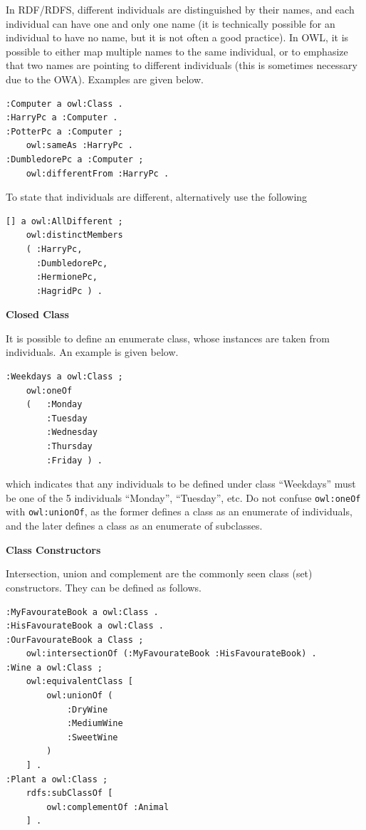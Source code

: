 In RDF/RDFS, different individuals are distinguished by their names, and each individual can have one and only one name (it is technically possible for an individual to have no name, but it is not often a good practice). In OWL, it is possible to either map multiple names to the same individual, or to emphasize that two names are pointing to different individuals (this is sometimes necessary due to the OWA). Examples are given below.
\begin{lstlisting}
:Computer a owl:Class .
:HarryPc a :Computer .
:PotterPc a :Computer ;
	owl:sameAs :HarryPc .
:DumbledorePc a :Computer ;
	owl:differentFrom :HarryPc .
\end{lstlisting}
To state that individuals are different, alternatively use the following
\begin{lstlisting}
[] a owl:AllDifferent ;
	owl:distinctMembers
	( :HarryPc,
	  :DumbledorePc,
	  :HermionePc,
	  :HagridPc	) .
\end{lstlisting}

\vspace{0.1in}
\noindent \textbf{Closed Class}
\vspace{0.1in}

It is possible to define an enumerate class, whose instances are taken from individuals. An example is given below.
\begin{lstlisting}
:Weekdays a owl:Class ;
	owl:oneOf
	(	:Monday
		:Tuesday
		:Wednesday
		:Thursday
		:Friday ) .
\end{lstlisting}
which indicates that any individuals to be defined under class ``Weekdays'' must be one of the 5 individuals ``Monday'', ``Tuesday'', etc. Do not confuse \verb|owl:oneOf| with \verb|owl:unionOf|, as the former defines a class as an enumerate of individuals, and the later defines a class as an enumerate of subclasses.

\vspace{0.1in}
\noindent \textbf{Class Constructors}
\vspace{0.1in}

Intersection, union and complement are the commonly seen class (set) constructors. They can be defined as follows.
\begin{lstlisting}
:MyFavourateBook a owl:Class .
:HisFavourateBook a owl:Class .
:OurFavourateBook a Class ;
	owl:intersectionOf (:MyFavourateBook :HisFavourateBook) .
:Wine a owl:Class ;
	owl:equivalentClass [
		owl:unionOf (
			:DryWine
			:MediumWine
			:SweetWine
		)
	] .
:Plant a owl:Class ;
	rdfs:subClassOf [
		owl:complementOf :Animal
	] .
\end{lstlisting}

